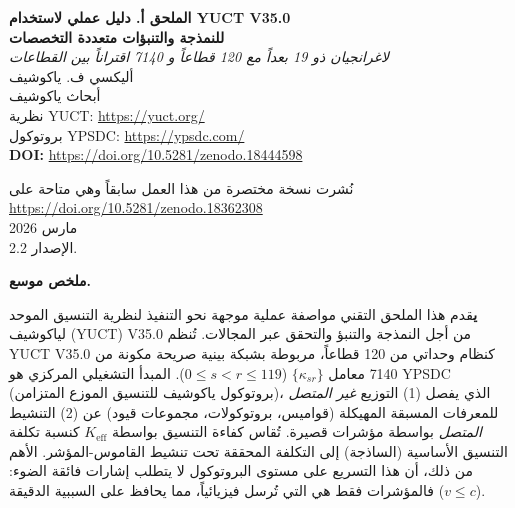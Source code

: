 \documentclass[13pt,a4paper]{article}
\newcommand{\Keff}{K_{\mathrm{eff}}}
\begin{document}
	
	\begin{titlepage}
		\begin{center}
			\vspace*{0.2cm}
			{\Huge\textbf{الملحق أ. 
					دليل عملي لاستخدام YUCT V35.0\\
					للنمذجة والتنبؤات متعددة التخصصات}}\\[0.8cm]
			
			{\Large\textit{لاغرانجيان ذو 19 بعداً مع 120 قطاعاً و 7140 اقتراناً بين القطاعات}}\\[1.2cm]
			
			{\Large أليكسي ف. ياكوشيف}\\[0.3cm]
			{\large أبحاث ياكوشيف}\\
			نظرية YUCT: \url{https://yuct.org/}\\
			بروتوكول YPSDC: \url{https://ypsdc.com/}\\
			
			\vspace{2cm}
			\textbf{DOI:} \url{https://doi.org/10.5281/zenodo.18444598}\\
			
			\vspace{1cm}
			
			\vspace{0cm}
			\large 
			نُشرت نسخة مختصرة من هذا العمل سابقاً وهي متاحة على\\ \url{https://doi.org/10.5281/zenodo.18362308}\\
			\vspace{1cm}
			مارس 2026 \\ \large الإصدار 2.2.
			
			\begin{minipage}{0.92\textwidth}
				\begin{center}\large\textbf{ملخص موسع.}\\
				\end{center}
				\large\textbf يقدم هذا الملحق التقني مواصفة عملية موجهة نحو التنفيذ لنظرية التنسيق الموحد لياكوشيف (YUCT) V35.0 من أجل النمذجة والتنبؤ والتحقق عبر المجالات. تُنظم YUCT V35.0 كنظام وحداتي من 120 قطاعاً، مربوطة بشبكة بينية صريحة مكونة من 7140 معامل $\{\kappa_{sr}\}$ ($0\le s<r\le 119$). المبدأ التشغيلي المركزي هو YPSDC (بروتوكول ياكوشيف للتنسيق الموزع المتزامن)، الذي يفصل (1) التوزيع \emph{غير المتصل} للمعرفات المسبقة المهيكلة (قواميس، بروتوكولات، مجموعات قيود) عن (2) التنشيط \emph{المتصل} بواسطة مؤشرات قصيرة. تُقاس كفاءة التنسيق بواسطة $\Keff$ كنسبة تكلفة التنسيق الأساسية (الساذجة) إلى التكلفة المحققة تحت تنشيط القاموس-المؤشر. الأهم من ذلك، أن هذا التسريع على مستوى البروتوكول لا يتطلب إشارات فائقة الضوء: فالمؤشرات فقط هي التي تُرسل فيزيائياً، مما يحافظ على السببية الدقيقة ($v\le c$).
				

\end{minipage}
\end{center}
\end{titlepage}
\end{document}
